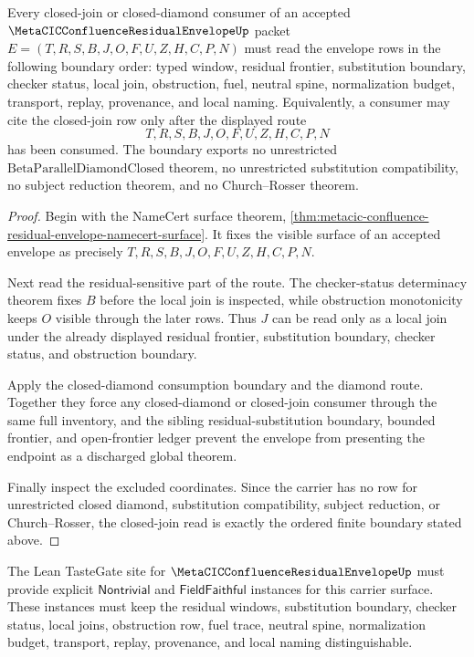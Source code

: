 \begin{theorem}
\label{thm:metacic-residual-envelope-closed-join-boundary}
Every closed-join or closed-diamond consumer of an accepted $\MetaCICConfluenceResidualEnvelopeUp$ packet $E=(T,R,S,B,J,O,F,U,Z,H,C,P,N)$ must read the envelope rows in the following boundary order: typed window, residual frontier, substitution boundary, checker status, local join, obstruction, fuel, neutral spine, normalization budget, transport, replay, provenance, and local naming. Equivalently, a consumer may cite the closed-join row only after the displayed route
$$
T,R,S,B,J,O,F,U,Z,H,C,P,N
$$
has been consumed. The boundary exports no unrestricted $\mathrm{BetaParallelDiamondClosed}$ theorem, no unrestricted substitution compatibility, no subject reduction theorem, and no Church--Rosser theorem.
\end{theorem}
\begin{proof}
Begin with the NameCert surface theorem,
\autoref{thm:metacic-confluence-residual-envelope-namecert-surface}. It fixes the visible surface of an accepted envelope as precisely $T,R,S,B,J,O,F,U,Z,H,C,P,N$.

Next read the residual-sensitive part of the route. The checker-status determinacy theorem fixes $B$ before the local join is inspected, while obstruction monotonicity keeps $O$ visible through the later rows. Thus $J$ can be read only as a local join under the already displayed residual frontier, substitution boundary, checker status, and obstruction boundary.

Apply the closed-diamond consumption boundary and the diamond route. Together they force any closed-diamond or closed-join consumer through the same full inventory, and the sibling residual-substitution boundary, bounded frontier, and open-frontier ledger prevent the envelope from presenting the endpoint as a discharged global theorem.

Finally inspect the excluded coordinates. Since the carrier has no row for unrestricted closed diamond, substitution compatibility, subject reduction, or Church--Rosser, the closed-join read is exactly the ordered finite boundary stated above.
\end{proof}

The Lean TasteGate site for $\MetaCICConfluenceResidualEnvelopeUp$ must provide explicit $\mathsf{Nontrivial}$ and $\mathsf{FieldFaithful}$ instances for this carrier surface. These instances must keep the residual windows, substitution boundary, checker status, local joins, obstruction row, fuel trace, neutral spine, normalization budget, transport, replay, provenance, and local naming distinguishable.

